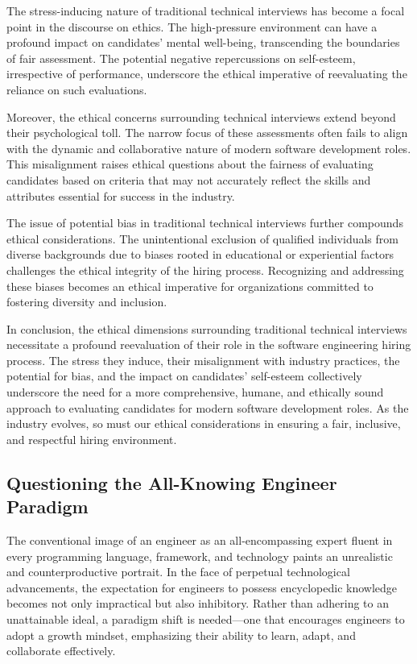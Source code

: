 \documentclass[
    a4paper, %
    10pt, %
    unnumberedsections, %
    twoside, %
]{LTJournalArticle}
\begin{document}
The stress-inducing nature of traditional technical interviews has become a focal point in the discourse on ethics. The high-pressure environment can have a profound impact on candidates' mental well-being, transcending the boundaries of fair assessment. The potential negative repercussions on self-esteem, irrespective of performance, underscore the ethical imperative of reevaluating the reliance on such evaluations.

Moreover, the ethical concerns surrounding technical interviews extend beyond their psychological toll. The narrow focus of these assessments often fails to align with the dynamic and collaborative nature of modern software development roles. This misalignment raises ethical questions about the fairness of evaluating candidates based on criteria that may not accurately reflect the skills and attributes essential for success in the industry.

The issue of potential bias in traditional technical interviews further compounds ethical considerations. The unintentional exclusion of qualified individuals from diverse backgrounds due to biases rooted in educational or experiential factors challenges the ethical integrity of the hiring process. Recognizing and addressing these biases becomes an ethical imperative for organizations committed to fostering diversity and inclusion.

In conclusion, the ethical dimensions surrounding traditional technical interviews necessitate a profound reevaluation of their role in the software engineering hiring process. The stress they induce, their misalignment with industry practices, the potential for bias, and the impact on candidates' self-esteem collectively underscore the need for a more comprehensive, humane, and ethically sound approach to evaluating candidates for modern software development roles. As the industry evolves, so must our ethical considerations in ensuring a fair, inclusive, and respectful hiring environment.



\subsection{Questioning the All-Knowing Engineer Paradigm}

The conventional image of an engineer as an all-encompassing expert fluent in every programming language, framework, and technology paints an unrealistic and counterproductive portrait. In the face of perpetual technological advancements, the expectation for engineers to possess encyclopedic knowledge becomes not only impractical but also inhibitory. Rather than adhering to an unattainable ideal, a paradigm shift is needed—one that encourages engineers to adopt a growth mindset, emphasizing their ability to learn, adapt, and collaborate effectively.
\end{document}
